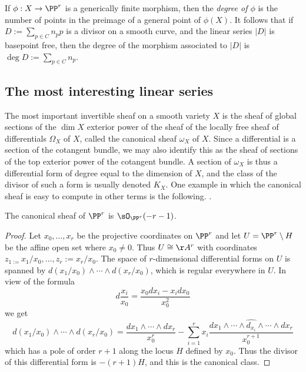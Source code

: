 If $\phi:X \to \PP^r$ is a generically finite morphism, then the \emph{degree of $\phi$} is the number of points in the preimage of a general point of $\phi(X)$. It follows that if $D := \sum_{p\in C} n_pp$ is a divisor on a smooth curve, and the linear series $|D|$ is basepoint free, then the degree of the morphism associated to $|D|$ is $\deg D := \sum_{p\in C} n_p$.

\subsection{The most interesting linear series}

The most important invertible sheaf on a smooth variety $X$ is the sheaf of global sections of the $\dim X$ exterior power of the   sheaf of the locally free sheaf of differentials $\Omega_X$ of $X$, called the canonical sheaf $\omega_X$ of $X$.  Since a differential
is a section of the cotangent bundle, we may also identify this as the sheaf of sections of the top exterior power of the 
cotangent bundle. A section of 
$\omega_X$ is thus a differential form of degree equal to the dimension of $X$, and the class of the divisor
of such a form is usually denoted $K_X$. One example in which the canonical sheaf is easy to compute in other terms is the following. .

\begin{theorem}
 The canonical sheaf of $\PP^{r}$ is $\sO_{\PP^{r}}(-r-1)$. 
\end{theorem}
\begin{proof}
Let $x_{0}, \dots, x_{r}$ be the projective coordinates on $\PP^{r}$ and let  $U = \PP^{r}\setminus H$ be the affine open set where $x_{0} \neq 0$. Thus $U \cong \AA^{r}$ with coordinates $z_{1 := }x_{1}/x_{0}, \dots, z_{r}:=x_{r}/x_{0}$. The space of $r$-dimensional differential forms on $U$ is spanned by $d(x_{1}/x_{0})\wedge\cdots\wedge d(x_{r}/x_{0})$, which is regular everywhere in $U$. In view of the formula
$$
d\frac{x_{i}}{x_{0}} = \frac{x_{0}dx_{i}-x_{i}dx_{0}}{x_{0}^{2}}
$$
we get
$$
d(x_{1}/x_{0})\wedge\cdots\wedge d(x_{r}/x_{0}) = \frac{dx_{1}\wedge\cdots\wedge dx_{r}}{x_{0}^{r}}-
\sum_{i=1}^{r} x_{i} \frac{ dx_{1}\wedge\cdots \wedge \widehat{d_{x_{i}}}\wedge \cdots \wedge dx_{r}}{x_{0}^{r+1}}
$$
which has a pole of order $r+1$ along the locus $H$ defined by $x_{0}$. Thus the divisor of this differential form
is $-(r+1)H$, and this is the canonical class.
\end{proof}

